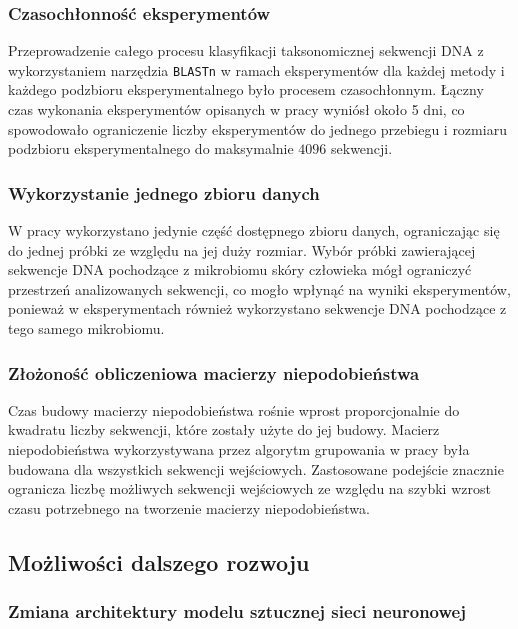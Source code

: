         \subsubsection{Czasochłonność eksperymentów}

            Przeprowadzenie całego procesu klasyfikacji taksonomicznej sekwencji DNA z wykorzystaniem narzędzia \texttt{BLASTn} w ramach eksperymentów dla każdej metody i każdego podzbioru eksperymentalnego było procesem czasochłonnym. Łączny czas wykonania eksperymentów opisanych w pracy wyniósł około 5 dni, co spowodowało ograniczenie liczby eksperymentów do jednego przebiegu i rozmiaru podzbioru eksperymentalnego do maksymalnie $4096$ sekwencji.

        \subsubsection{Wykorzystanie jednego zbioru danych}

            W pracy wykorzystano jedynie część dostępnego zbioru danych, ograniczając się do jednej próbki ze względu na jej duży rozmiar. Wybór próbki zawierającej sekwencje DNA pochodzące z mikrobiomu skóry człowieka mógł ograniczyć przestrzeń analizowanych sekwencji, co mogło wpłynąć na wyniki eksperymentów, ponieważ w eksperymentach również wykorzystano sekwencje DNA pochodzące z tego samego mikrobiomu.

        \subsubsection{Złożoność obliczeniowa macierzy niepodobieństwa}

            Czas budowy macierzy niepodobieństwa rośnie wprost proporcjonalnie do kwadratu liczby sekwencji, które zostały użyte do jej budowy. Macierz niepodobieństwa wykorzystywana przez algorytm grupowania w pracy była budowana dla wszystkich sekwencji wejściowych. Zastosowane podejście znacznie ogranicza liczbę możliwych sekwencji wejściowych ze względu na szybki wzrost czasu potrzebnego na tworzenie macierzy niepodobieństwa.

    \subsection{Możliwości dalszego rozwoju}

        \subsubsection{Zmiana architektury modelu sztucznej sieci neuronowej}

